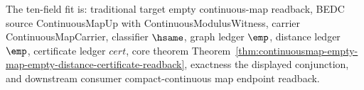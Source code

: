 The ten-field fit is: traditional target empty continuous-map readback, BEDC
source ContinuousMapUp with ContinuousModulusWitness, carrier
ContinuousMapCarrier, classifier $\hsame$, graph ledger $\emp$, distance ledger
$\emp$, certificate ledger $cert$, core theorem
Theorem~\ref{thm:continuousmap-empty-map-empty-distance-certificate-readback},
exactness the displayed conjunction, and downstream consumer compact-continuous
map endpoint readback.
